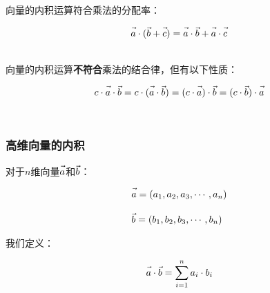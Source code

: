 \documentclass[UTF8]{ctexart}
\let\nvec\vec
\def\vec#1{\nvec{\vphantom b\smash{#1}}}
\begin{document}
    向量的内积运算符合乘法的分配率：
    \begin{large}
    \begin{equation*}
        \vec{a}\cdot(\vec{b}+\vec{c})=\vec{a}\cdot\vec{b}+\vec{a}\cdot\vec{c}
    \end{equation*}
    \end{large}\\
    向量的内积运算\textbf{不符合}乘法的结合律，但有以下性质：
    \begin{large}
    \begin{equation*}
        c\cdot\vec{a}\cdot\vec{b}=c\cdot(\vec{a}\cdot\vec{b})=(c\cdot\vec{a})\cdot\vec{b}=(c\cdot\vec{b})\cdot\vec{a}
    \end{equation*}
    \end{large}\\

\newpage

\subsubsection{高维向量的内积}
    对于$n$维向量$\vec{a}$和$\vec{b}$：
    \begin{large}
    \begin{align*}
        &\vec{a}=\left(a_1,a_2,a_3,\cdots,a_n\right)\\[3mm]
        &\vec{b}=\left(b_1,b_2,b_3,\cdots,b_n\right)
    \end{align*}
    \end{large}
    我们定义：
    \begin{large}
    \begin{equation*}
        \vec{a}\cdot\vec{b}=\sum^n_{i=1}a_i\cdot b_i
    \end{equation*}
    \end{large}
\end{document}
